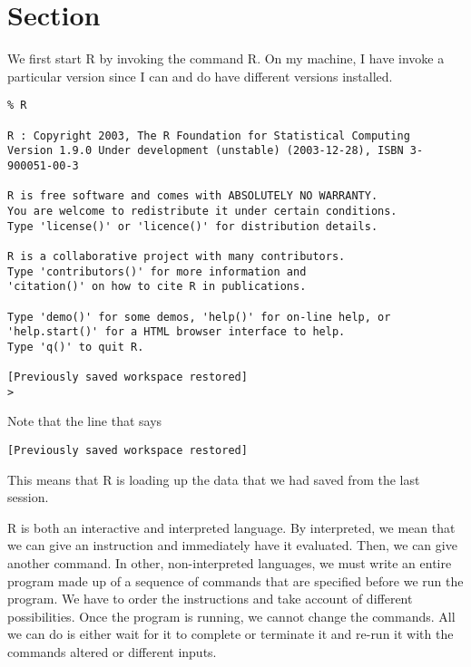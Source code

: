 \section{Section}
\label{id683933}\hypertarget{id683933}{}%
We first start R by invoking the command R. On my machine, I have invoke a particular version since I can and do have different versions installed. 
\begin{verbatim}
% R

R : Copyright 2003, The R Foundation for Statistical Computing
Version 1.9.0 Under development (unstable) (2003-12-28), ISBN 3-900051-00-3

R is free software and comes with ABSOLUTELY NO WARRANTY.
You are welcome to redistribute it under certain conditions.
Type 'license()' or 'licence()' for distribution details.

R is a collaborative project with many contributors.
Type 'contributors()' for more information and
'citation()' on how to cite R in publications.

Type 'demo()' for some demos, 'help()' for on-line help, or
'help.start()' for a HTML browser interface to help.
Type 'q()' to quit R.

[Previously saved workspace restored]
> 
\end{verbatim}
 Note that the line that says 
\begin{verbatim}
[Previously saved workspace restored]
\end{verbatim}
 This means that R is loading up the data that we had saved from the last session. 

 R is both an interactive and interpreted language. By interpreted, we mean that we can give an instruction and immediately have it evaluated. Then, we can give another command. In other, non-interpreted languages, we must write an entire program made up of a sequence of commands that are specified before we run the program. We have to order the instructions and take account of different possibilities. Once the program is running, we cannot change the commands. All we can do is either wait for it to complete or terminate it and re-run it with the commands altered or different inputs. 

